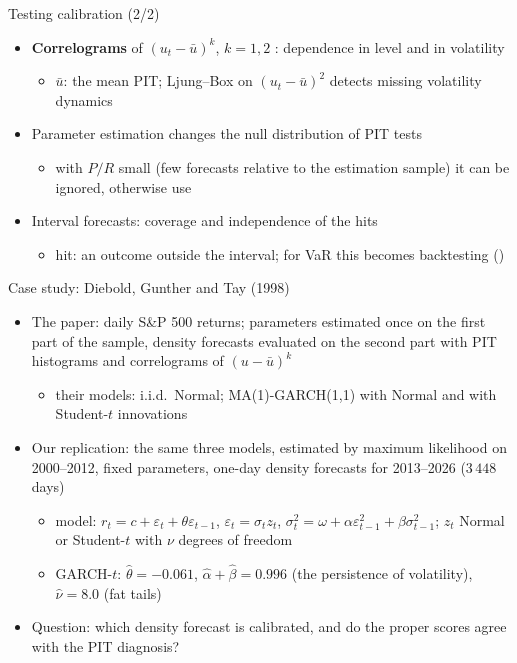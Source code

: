 \begin{frame}{Testing calibration (2/2)}
\itemsize{\small}
\begin{itemize}
    \item \textbf{Correlograms} of $(u_t - \bar u)^k$, $k = 1, 2$ : dependence in level and in volatility
    \begin{itemize}
        \item $\bar u$: the mean PIT; Ljung--Box on $(u_t - \bar u)^2$ detects missing volatility dynamics
    \end{itemize}
    \item Parameter estimation changes the null distribution of PIT tests
    \begin{itemize}
        \item with $P/R$ small (few forecasts relative to the estimation sample) it can be ignored, otherwise use 
    \end{itemize}
    \item Interval forecasts: coverage and independence of the hits 
    \begin{itemize}
        \item hit: an outcome outside the interval; for VaR this becomes backtesting ()
    \end{itemize}
\end{itemize}
\end{frame}

\begin{frame}{Case study: Diebold, Gunther and Tay (1998)}
\itemsize{\small}
\begin{itemize}
    \item The paper: daily S\&P 500 returns; parameters estimated once on the first part of the sample, density forecasts evaluated on the second part with PIT histograms and correlograms of $(u - \bar u)^k$ 
    \begin{itemize}
        \item their models: i.i.d.\ Normal; MA(1)-GARCH(1,1) with Normal and with Student-$t$ innovations 
    \end{itemize}
    \item Our replication: the same three models, estimated by maximum likelihood on 2000--2012, fixed parameters, one-day density forecasts for 2013--2026 ($3\,448$ days)
    \begin{itemize}
        \item model: $r_t = c + \varepsilon_t + \theta\varepsilon_{t-1}$, $\varepsilon_t = \sigma_tz_t$, $\sigma_t^2 = \omega + \alpha\varepsilon_{t-1}^2 + \beta\sigma_{t-1}^2$; $z_t$ Normal or Student-$t$ with $\nu$ degrees of freedom
        \item GARCH-$t$: $\hat\theta = \ensuremath{-}0.061$, $\hat\alpha + \hat\beta = 0.996$ (the persistence of volatility), $\hat\nu = 8.0$ (fat tails)
    \end{itemize}
    \item Question: which density forecast is calibrated, and do the proper scores agree with the PIT diagnosis?
\end{itemize}
\end{frame}

